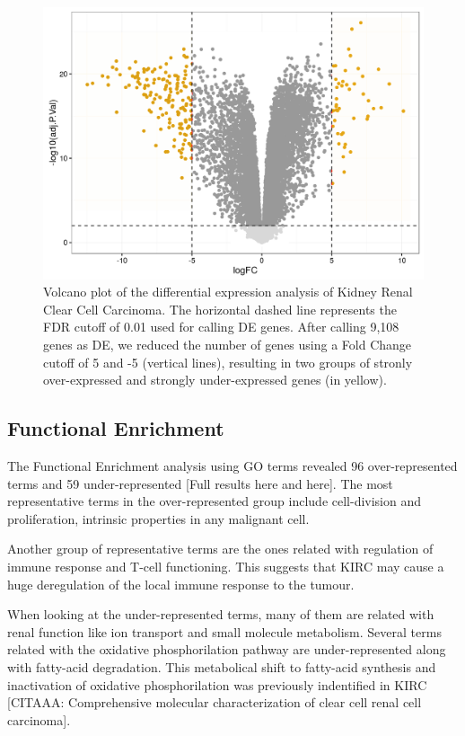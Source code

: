 \documentclass[9pt,twocolumn,twoside]{gsajnl}
\begin{document}
\begin{figure}[htbp]
\centering
\includegraphics[width=\linewidth]{figures/fig1_volcano.png}
\caption{Volcano plot of the differential expression analysis of Kidney Renal Clear Cell Carcinoma. The horizontal dashed line represents the FDR cutoff of 0.01 used for calling DE genes. After calling 9,108 genes as DE, we reduced the number of genes using a Fold Change cutoff of 5 and -5 (vertical lines), resulting in two groups of stronly over-expressed and strongly under-expressed genes (in yellow). }%
\label{fig:spectrum}
\end{figure}

\subsection*{Functional Enrichment}
The Functional Enrichment analysis using GO terms revealed 96 over-represented terms and 59 under-represented [Full results here and here]. The most representative terms in the over-represented group include cell-division and proliferation, intrinsic properties in any malignant cell. 

Another group of representative terms are the ones related with regulation of immune response and T-cell functioning. This suggests that KIRC may cause a huge deregulation of the local immune response to the tumour. 

When looking at the under-represented terms, many of them are related with renal function like ion transport and small molecule metabolism. Several terms related with the oxidative phosphorilation pathway are under-represented along with fatty-acid degradation. This metabolical shift to fatty-acid synthesis and inactivation of oxidative phosphorilation was previously indentified in KIRC [CITAAA: Comprehensive molecular characterization of clear cell renal cell carcinoma].
\end{document}
